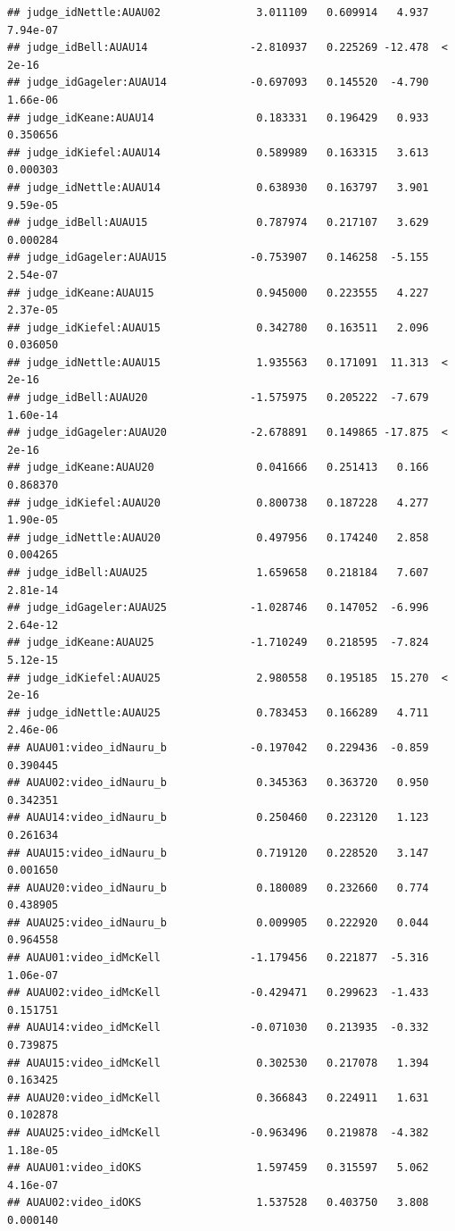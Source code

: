 \documentclass{monashthesis}
\begin{document}
\begin{verbatim}
## judge_idNettle:AUAU02               3.011109   0.609914   4.937 7.94e-07
## judge_idBell:AUAU14                -2.810937   0.225269 -12.478  < 2e-16
## judge_idGageler:AUAU14             -0.697093   0.145520  -4.790 1.66e-06
## judge_idKeane:AUAU14                0.183331   0.196429   0.933 0.350656
## judge_idKiefel:AUAU14               0.589989   0.163315   3.613 0.000303
## judge_idNettle:AUAU14               0.638930   0.163797   3.901 9.59e-05
## judge_idBell:AUAU15                 0.787974   0.217107   3.629 0.000284
## judge_idGageler:AUAU15             -0.753907   0.146258  -5.155 2.54e-07
## judge_idKeane:AUAU15                0.945000   0.223555   4.227 2.37e-05
## judge_idKiefel:AUAU15               0.342780   0.163511   2.096 0.036050
## judge_idNettle:AUAU15               1.935563   0.171091  11.313  < 2e-16
## judge_idBell:AUAU20                -1.575975   0.205222  -7.679 1.60e-14
## judge_idGageler:AUAU20             -2.678891   0.149865 -17.875  < 2e-16
## judge_idKeane:AUAU20                0.041666   0.251413   0.166 0.868370
## judge_idKiefel:AUAU20               0.800738   0.187228   4.277 1.90e-05
## judge_idNettle:AUAU20               0.497956   0.174240   2.858 0.004265
## judge_idBell:AUAU25                 1.659658   0.218184   7.607 2.81e-14
## judge_idGageler:AUAU25             -1.028746   0.147052  -6.996 2.64e-12
## judge_idKeane:AUAU25               -1.710249   0.218595  -7.824 5.12e-15
## judge_idKiefel:AUAU25               2.980558   0.195185  15.270  < 2e-16
## judge_idNettle:AUAU25               0.783453   0.166289   4.711 2.46e-06
## AUAU01:video_idNauru_b             -0.197042   0.229436  -0.859 0.390445
## AUAU02:video_idNauru_b              0.345363   0.363720   0.950 0.342351
## AUAU14:video_idNauru_b              0.250460   0.223120   1.123 0.261634
## AUAU15:video_idNauru_b              0.719120   0.228520   3.147 0.001650
## AUAU20:video_idNauru_b              0.180089   0.232660   0.774 0.438905
## AUAU25:video_idNauru_b              0.009905   0.222920   0.044 0.964558
## AUAU01:video_idMcKell              -1.179456   0.221877  -5.316 1.06e-07
## AUAU02:video_idMcKell              -0.429471   0.299623  -1.433 0.151751
## AUAU14:video_idMcKell              -0.071030   0.213935  -0.332 0.739875
## AUAU15:video_idMcKell               0.302530   0.217078   1.394 0.163425
## AUAU20:video_idMcKell               0.366843   0.224911   1.631 0.102878
## AUAU25:video_idMcKell              -0.963496   0.219878  -4.382 1.18e-05
## AUAU01:video_idOKS                  1.597459   0.315597   5.062 4.16e-07
## AUAU02:video_idOKS                  1.537528   0.403750   3.808 0.000140

\end{verbatim}
\end{document}
